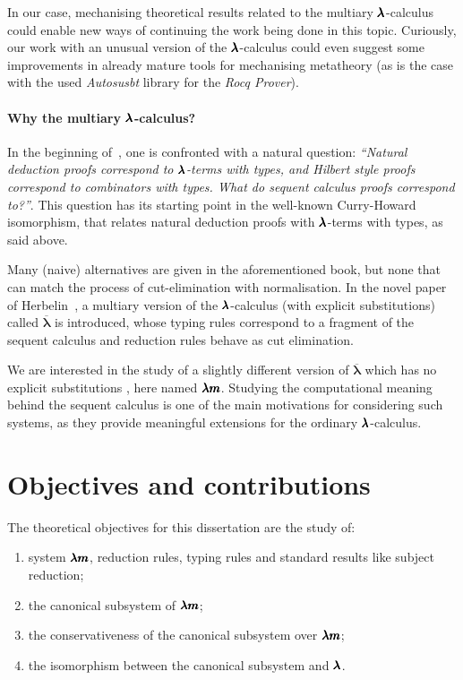 In our case, mechanising theoretical results related to the multiary $\pmb{\lambda}$-calculus could enable new ways of continuing the work being done in this topic.
Curiously, our work with an unusual version of the $\pmb{\lambda}$-calculus could even suggest some improvements in already mature tools for mechanising metatheory (as is the case with the used \textit{Autosusbt} library for the \textit{Rocq Prover}).

\paragraph{Why the multiary $\pmb{\lambda}$-calculus?}
In the beginning of~\cite[Chapter~7.3]{CurryHoward}, one is confronted with a natural question: \textit{``Natural deduction proofs correspond to $\pmb{\lambda}$-terms with types, and Hilbert style proofs correspond to combinators with types. What do sequent calculus proofs correspond to?''}.
This question has its starting point in the well-known Curry-Howard isomorphism, that relates natural deduction proofs with $\pmb{\lambda}$-terms with types, as said above.

Many (naive) alternatives are given in the aforementioned book, but none that can match the process of cut-elimination with normalisation.
In the novel paper of Herbelin~\cite{Herbelin1994}, a multiary version of the $\pmb{\lambda}$-calculus (with explicit substitutions) called $\overline{\pmb \lambda}$ is introduced, whose typing rules correspond to a fragment of the sequent calculus and reduction rules behave as cut elimination.

We are interested in the study of a slightly different version of $\overline{\pmb \lambda}$ which has no explicit substitutions \cite{JCES2002, JCESLuis}, here named $\pmb{\lambda m}$.
Studying the computational meaning behind the sequent calculus is one of the main motivations for considering such systems, as they provide meaningful extensions for the ordinary $\pmb{\lambda}$-calculus.

\section{Objectives and contributions}
The theoretical objectives for this dissertation are the study of:
\begin{enumerate}
\item system $\pmb{\lambda m}$, reduction rules, typing rules and standard results like subject reduction;
\item the canonical subsystem of $\pmb{\lambda m}$;
\item the conservativeness of the canonical subsystem over $\pmb{\lambda m}$;
\item the isomorphism between the canonical subsystem and $\pmb{\lambda}$.
\end{enumerate}

